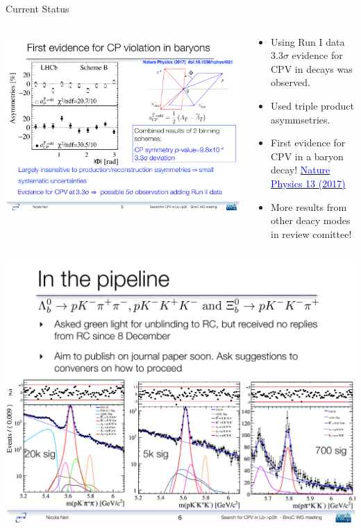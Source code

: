 \documentclass{beamer}
\begin{document}
\begin{frame}{Current Status}
  \small
  \begin{columns}
    \begin{column}{.4\textwidth}
      \includegraphics[width=\textwidth]{Run1CPV.pdf}
    \end{column}
    \begin{column}{.65\textwidth}
      \begin{itemize}
      \item Using Run I data $3.3\sigma$ evidence for CPV in \decay{\Lb}{\proton \pim\pip\pim} decays was observed.
      \item Used triple product asymmsetries.
      \item First evidence for CPV in a baryon decay! \href{http://www.nature.com/nphys/journal/v13/n4/full/nphys4021.html}{\textcolor{blue}{Nature Physics 13 (2017)}}
      \item More results from other deacy modes in review comittee!
      \end{itemize}
    \end{column}
  \end{columns}
  \begin{center}\includegraphics[width=.75\textwidth]{NewCPVChannels.pdf}\end{center}
\end{frame}
\end{document}
